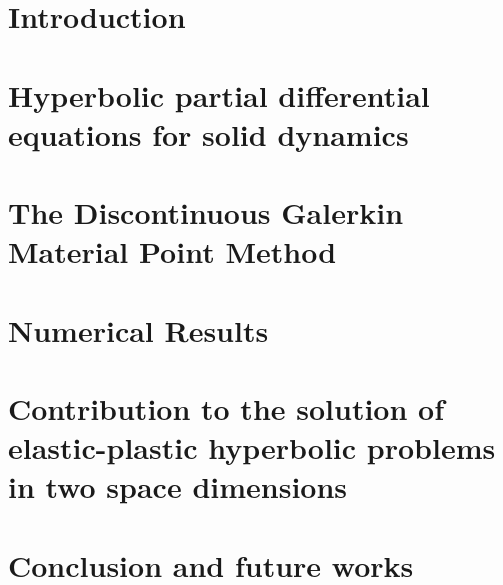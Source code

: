 \documentclass[10pt,a4paper,twoside]{report}
\begin{document}

\tableofcontents{}


\chapter{Introduction}



\chapter{Hyperbolic partial differential equations for solid dynamics}
\label{chap:chap2}


\chapter{The Discontinuous Galerkin Material Point Method}
\label{chap:chap3}


\chapter{Numerical Results}
\label{chap:chap4}


\chapter{Contribution to the solution of elastic-plastic hyperbolic problems in two space dimensions}
\label{chap:chap5}



\chapter{Conclusion and future works}









\end{document}
